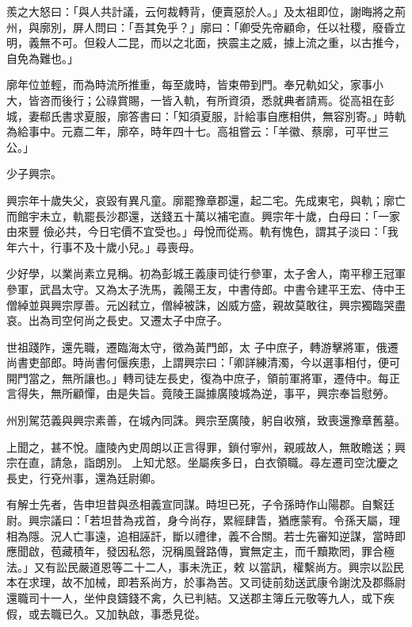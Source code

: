 \begin{pinyinscope}
 羨之大怒曰：「與人共計議，云何裁轉背，便賣惡於人。」及太祖即位，謝晦將之荊州，與廓別，屏人問曰：「吾其免乎？」廓曰：「卿受先帝顧命，任以社稷，廢昏立明，義無不可。但殺人二昆，而以之北面，挾震主之威，據上流之重，以古推今，自免為難也。」



 廓年位並輕，而為時流所推重，每至歲時，皆束帶到門。奉兄軌如父，家事小
 大，皆咨而後行；公祿賞賜，一皆入軌，有所資須，悉就典者請焉。從高祖在彭城，妻郗氏書求夏服，廓答書曰：「知須夏服，計給事自應相供，無容別寄。」時軌為給事中。元嘉二年，廓卒，時年四十七。高祖嘗云：「羊徽、蔡廓，可平世三公。」



 少子興宗。



 興宗年十歲失父，哀毀有異凡童。廓罷豫章郡還，起二宅。先成東宅，與軌；廓亡而館宇未立，軌罷長沙郡還，送錢五十萬以補宅直。興宗年十歲，白母曰：「一家由來豐
 儉必共，今日宅價不宜受也。」母悅而從焉。軌有愧色，謂其子淡曰：「我年六十，行事不及十歲小兒。」尋喪母。



 少好學，以業尚素立見稱。初為彭城王義康司徒行參軍，太子舍人，南平穆王冠軍參軍，武昌太守。又為太子洗馬，義陽王友，中書侍郎。中書令建平王宏、侍中王僧綽並與興宗厚善。元凶弒立，僧綽被誅，凶威方盛，親故莫敢往，興宗獨臨哭盡哀。出為司空何尚之長史。又遷太子中庶子。



 世祖踐阼，還先職，遷臨海太守，徵為黃門郎，太
 子中庶子，轉游擊將軍，俄遷尚書吏部郎。時尚書何偃疾患，上謂興宗曰：「卿詳練清濁，今以選事相付，便可開門當之，無所讓也。」轉司徒左長史，復為中庶子，領前軍將軍，遷侍中。每正言得失，無所顧憚，由是失旨。竟陵王誕據廣陵城為逆，事平，興宗奉旨慰勞。



 州別駕范義與興宗素善，在城內同誅。興宗至廣陵，躬自收殯，致喪還豫章舊墓。



 上聞之，甚不悅。廬陵內史周朗以正言得罪，鎖付寧州，親戚故人，無敢瞻送；興宗在直，請急，詣朗別。
 上知尤怒。坐屬疾多日，白衣領職。尋左遷司空沈慶之長史，行兗州事，還為廷尉卿。



 有解士先者，告申坦昔與丞相義宣同謀。時坦已死，子令孫時作山陽郡。自繫廷尉。興宗議曰：「若坦昔為戎首，身今尚存，累經肆眚，猶應蒙宥。令孫天屬，理相為隱。況人亡事遠，追相誣訐，斷以禮律，義不合關。若士先審知逆謀，當時即應聞啟，苞藏積年，發因私怨，況稱風聲路傳，實無定主，而千黷欺罔，罪合極法。」又有訟民嚴道恩等二十二人，事未洗正，敕
 以當訊，權繫尚方。興宗以訟民本在求理，故不加械，即若系尚方，於事為苦。又司徒前劾送武康令謝沈及郡縣尉還職司十一人，坐仲良鑄錢不禽，久已判結。又送郡主簿丘元敬等九人，或下疾假，或去職已久。又加執啟，事悉見從。




\end{pinyinscope}
